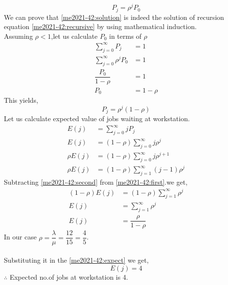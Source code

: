 \begin{equation}
    P_j=\rho^j P_0 \label{me2021-42:solution}
\end{equation}
We can prove that \eqref{me2021-42:solution} is indeed the solution of recursion equation \eqref{me2021-42:recursive} by using mathematical induction.\\
Assuming $\rho<1$,let us calculate $P_0$ in terms of $\rho$
\begin{align}
    \sum_{j=0}^{\infty}P_j&=1\\
    \sum_{j=0}^{\infty}\rho^j P_0 &=1\\
    \dfrac{P_0}{1-\rho}&=1\\
    P_0&=1-\rho
\end{align}
This yields,\\
\begin{equation}
    P_j=\rho^j(1-\rho)
\end{equation}
Let us calculate expected value of jobs waiting at workstation.
\begin{align}
    E(j)&=\sum_{j=0}^{\infty}jP_j\\
    E(j)&=(1-\rho)\sum_{j=0}^{\infty}j\rho^j\label{me2021-42:first}\\
    \rho E(j)&=(1-\rho)\sum_{j=0}^{\infty}j\rho^{j+1}\\
    \rho E(j)&=(1-\rho)\sum_{j=1}^{\infty}(j-1)\rho^{j}\label{me2021-42:second}
\end{align}
Subtracting \eqref{me2021-42:second} from \eqref{me2021-42:first}.we get,
\begin{align}
    (1-\rho)E(j)&=(1-\rho)\sum_{j=1}^{\infty}\rho^j\\
    E(j)&=\sum_{j=1}^{\infty}\rho^j\\
    E(j)&=\dfrac{\rho}{1-\rho}\label{me2021-42:expect}
\end{align}
In our case $\rho=\dfrac{\lambda}{\mu}=\dfrac{12}{15}=\dfrac{4}{5}$.\\\\Substituting it in the \eqref{me2021-42:expect} we get,\\
\begin{equation}
    E(j)=4
\end{equation}
$\therefore$ Expected no.of jobs at workstation is 4.
